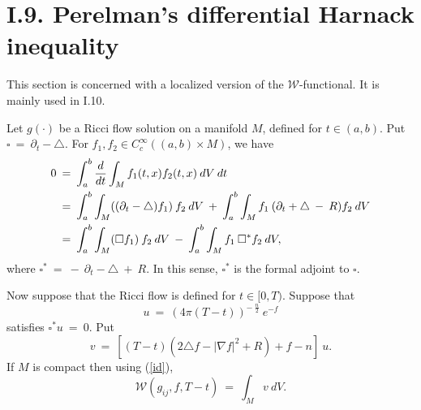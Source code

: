 \documentclass[12pt]{amsart}
\numberwithin{equation}{section}
\theoremstyle{plain}
\theoremstyle{definition}
\theoremstyle{remark}
\begin{document}
\section{I.9. Perelman's differential Harnack inequality}
\label{I.9}

This section is concerned with a localized version of the ${\mathcal W}$-functional.
It is mainly used in I.10.  

Let $g(\cdot)$ be a Ricci flow solution on a manifold $M$, defined for
$t \in (a,b)$. Put
$\square \: = \: \partial_t - \triangle$. For $f_1, f_2 \in C^\infty_c((a,b) \times M)$, we have
\begin{align}
0 \: & = \: \int_a^b \frac{d}{dt} \int_M f_1(t,x) f_2(t,x) \: dV \: dt \\
&  = \:
\int_a^b \int_M ((\partial_t - \triangle) f_1) \: f_2 \: dV \: + \:
\int_a^b \int_M f_1 \: (\partial_t + \triangle \: - \: R) f_2 \: dV \notag \\
&  = \:
\int_a^b \int_M (\square f_1) \: f_2 \: dV \: - \:
\int_a^b \int_M f_1 \:  \square^* f_2 \: dV, \notag
\end{align}
where $\square^* \: = \: - \: \partial_t - \triangle \: + \: R$. In this sense,
$\square^*$ is the formal adjoint to $\square$.

Now suppose that the Ricci flow is defined for $t \in [0,T)$.
Suppose that 
\begin{equation}
u \: = \: (4\pi(T-t))^{- \: \frac{n}{2}} \: e^{-f}
\end{equation}
satisfies $\square^* u \: = \: 0$. Put
\begin{equation} \label{veqn}
v \: = \: [(T-t)(2\triangle f - |\nabla f|^2 + R) + f - n ] \: u.
\end{equation}
If $M$ is compact then using (\ref{id}),
\begin{equation}
{\mathcal W}(g_{ij},f,T-t) \: = \: \int_M v \: dV.
\end{equation}
\end{document}

